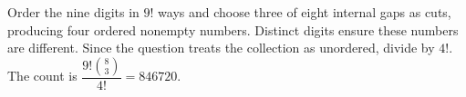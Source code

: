 Order the nine digits in $9!$ ways and choose three of eight internal gaps as cuts, producing four ordered nonempty numbers. Distinct digits ensure these numbers are different. Since the question treats the collection as unordered, divide by $4!$. The count is $\dfrac{9!\binom83}{4!}=\boxed{846720}$.
